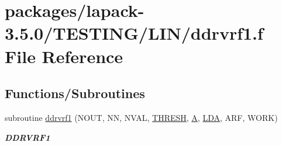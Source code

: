 \hypertarget{ddrvrf1_8f}{}\section{packages/lapack-\/3.5.0/\+T\+E\+S\+T\+I\+N\+G/\+L\+I\+N/ddrvrf1.f File Reference}
\label{ddrvrf1_8f}
\subsection*{Functions/\+Subroutines}
\begin{DoxyCompactItemize}
\item 
subroutine \hyperlink{group__double__lin_ga13742181da3e865ce8ade77e43cf29ab}{ddrvrf1} (N\+O\+U\+T, N\+N, N\+V\+A\+L, \hyperlink{zlaqgs_8c_a0656018abfc9fa2821827415f5d5ea57}{T\+H\+R\+E\+S\+H}, \hyperlink{classA}{A}, \hyperlink{example__user_8c_ae946da542ce0db94dced19b2ecefd1aa}{L\+D\+A}, A\+R\+F, W\+O\+R\+K)
\begin{DoxyCompactList}\small\item\em {\bfseries D\+D\+R\+V\+R\+F1} \end{DoxyCompactList}\end{DoxyCompactItemize}
